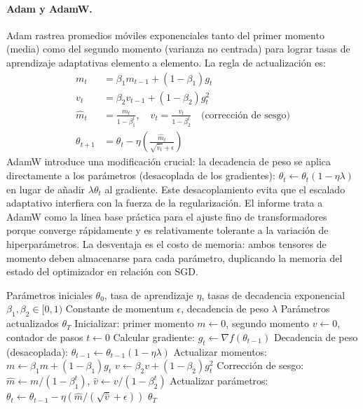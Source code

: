 \paragraph{Adam y AdamW.}
Adam rastrea promedios móviles exponenciales tanto del primer momento (media) como del segundo momento (varianza no centrada) para lograr tasas de aprendizaje adaptativas elemento a elemento. La regla de actualización es:
\begin{align}
m_t &= \beta_1 m_{t-1} + (1-\beta_1) g_t \\
v_t &= \beta_2 v_{t-1} + (1-\beta_2) g_t^2 \\
\hat{m}_t &= \frac{m_t}{1-\beta_1^t}, \quad \hat{v}_t = \frac{v_t}{1-\beta_2^t} \quad \text{(corrección de sesgo)} \\
\theta_{t+1} &= \theta_t - \eta \left(\frac{\hat{m}_t}{\sqrt{\hat{v}_t}+\epsilon}\right)
\end{align}
AdamW introduce una modificación crucial: la decadencia de peso se aplica directamente a los parámetros (desacoplada de los gradientes): $\theta_t \gets \theta_t(1-\eta\lambda)$ en lugar de añadir $\lambda\theta_t$ al gradiente. Este desacoplamiento evita que el escalado adaptativo interfiera con la fuerza de la regularización. El informe trata a AdamW como la línea base práctica para el ajuste fino de transformadores porque converge rápidamente y es relativamente tolerante a la variación de hiperparámetros. La desventaja es el costo de memoria: ambos tensores de momento deben almacenarse para cada parámetro, duplicando la memoria del estado del optimizador en relación con SGD.

\begin{algorithm}[H]
\caption{AdamW (Adam con Decadencia de Peso Desacoplada)}
\label{alg:adamw}
\begin{algorithmic}[1]
\Require Parámetros iniciales $\theta_0$, tasa de aprendizaje $\eta$, tasas de decadencia exponencial $\beta_1, \beta_2 \in [0,1)$
\Require Constante de momentum $\epsilon$, decadencia de peso $\lambda$
\Ensure Parámetros actualizados $\theta_T$
\State Inicializar: primer momento $m \gets 0$, segundo momento $v \gets 0$, contador de pasos $t \gets 0$
    \State Calcular gradiente: $g_t \gets \nabla f(\theta_{t-1})$
    \State Decadencia de peso (desacoplada): $\theta_{t-1} \gets \theta_{t-1}(1 - \eta\lambda)$
    \State Actualizar momentos: $m \gets \beta_1 m + (1-\beta_1) g_t$
    \State $v \gets \beta_2 v + (1-\beta_2) g_t^2$
    \State Corrección de sesgo: $\hat{m} \gets m / (1 - \beta_1^t)$, $\hat{v} \gets v / (1 - \beta_2^t)$
    \State Actualizar parámetros: $\theta_t \gets \theta_{t-1} - \eta (\hat{m} / (\sqrt{\hat{v}} + \epsilon))$
\EndFor
\Return $\theta_T$
\end{algorithmic}
\end{algorithm}

